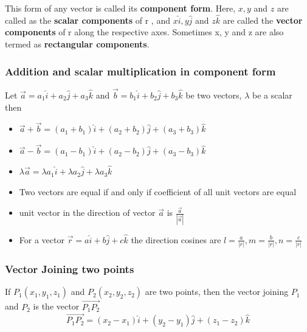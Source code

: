\documentclass[12pt]{article}
\begin{document}
\begin{multicols*}{2}
This form of any vector is called its \textbf{component form}. Here, $x, y$ and $z$ are called
as the \textbf{scalar components} of r , and $x\hat{i}, y\hat{j}$ and $z \hat{k}$ are called the \textbf{vector components}
of r along the respective axes. Sometimes x, y and z are also termed as \textbf{rectangular
components}.
\subsubsection*{Addition and scalar multiplication in component form}
Let $\vec{a}=a_1 \hat{i}+a_2 \hat{j}+a_3 \hat{k}$ and $\vec{b}=b_1 \hat{i}+b_2 \hat{j}+b_3 \hat{k}$ be two vectors, $\lambda$ be a scalar then \begin{itemize}
    \item $\vec{a}+\vec{b}=(a_1+b_1)\hat{i}+(a_2+b_2)\hat{j}+(a_3+b_3)\hat{k}$
    \item $\vec{a}-\vec{b}=(a_1-b_1)\hat{i}+(a_2-b_2)\hat{j}+(a_3-b_3)\hat{k}$
    \item $\lambda \vec{a}=\lambda a_1 \hat{i}+\lambda a_2 \hat{j}+\lambda a_3 \hat{k}$


    \item Two vectors are equal if  and only if coefficient of all unit vectors are equal 
    \item unit vector in the direction of vector $\vec{a}$ is $\frac{\vec{a}}{|\vec{a}|}$
    \item For a vector $\vec{r}=a \hat{i}+b \hat{j}+c \hat{k}$ the direction cosines are $l=\frac{a}{|r|},m=\frac{b}{|r|},n=\frac{c}{|r|}$
\end{itemize}



\subsubsection*{Vector Joining two points}
If $P_1(x_1, y_1, z_1)$ and $P_2(x_2, y_2, z_2)$ are two points, then the vector joining $P_1$ and $P_2$ is the vector $\vec{P_1 P_2}$ $$\vec{P_1P_2}=(x_2-x_1)\hat{i}+(y_2-y_1) \hat{j}+(z_1-z_2) \hat{k}$$



\end{multicols*}
\end{document}
